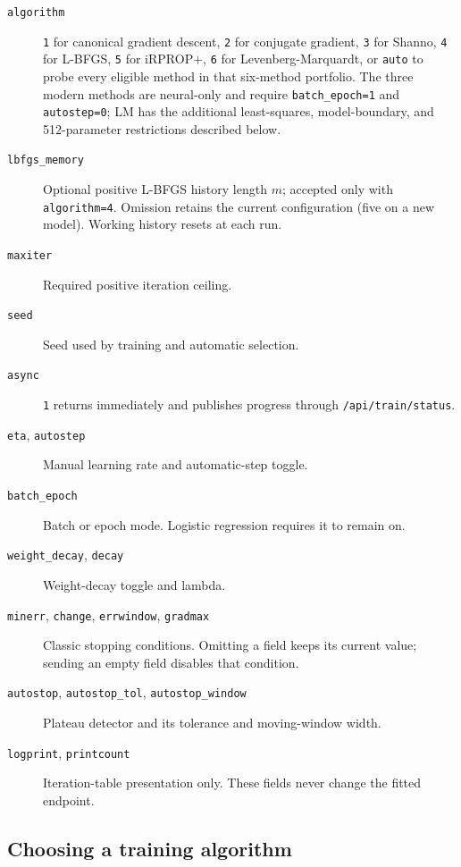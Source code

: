 \begin{description}
\item[\texttt{algorithm}] \texttt{1} for canonical gradient descent,
\texttt{2} for conjugate gradient, \texttt{3} for Shanno, \texttt{4} for
L-BFGS, \texttt{5} for iRPROP+, \texttt{6} for Levenberg-Marquardt, or
\texttt{auto} to probe every eligible method in that six-method portfolio.
The three modern methods are neural-only and require
\texttt{batch\_epoch=1} and \texttt{autostep=0}; LM has the additional
least-squares, model-boundary, and 512-parameter restrictions described below.
\item[\texttt{lbfgs\_memory}] Optional positive L-BFGS history length $m$;
accepted only with \texttt{algorithm=4}. Omission retains the current
configuration (five on a new model). Working history resets at each run.
\item[\texttt{maxiter}] Required positive iteration ceiling.
\item[\texttt{seed}] Seed used by training and automatic selection.
\item[\texttt{async}] \texttt{1} returns immediately and publishes
progress through \texttt{/api/train/status}.
\item[\texttt{eta}, \texttt{autostep}] Manual learning rate and
automatic-step toggle.
\item[\texttt{batch\_epoch}] Batch or epoch mode.  Logistic regression
requires it to remain on.
\item[\texttt{weight\_decay}, \texttt{decay}] Weight-decay toggle and
lambda.
\item[\texttt{minerr}, \texttt{change}, \texttt{errwindow},
\texttt{gradmax}] Classic stopping conditions.  Omitting a field keeps
its current value; sending an empty field disables that condition.
\item[\texttt{autostop}, \texttt{autostop\_tol},
\texttt{autostop\_window}] Plateau detector and its tolerance and
moving-window width.
\item[\texttt{logprint}, \texttt{printcount}] Iteration-table
presentation only.  These fields never change the fitted endpoint.
\end{description}

\subsection{Choosing a training algorithm}

